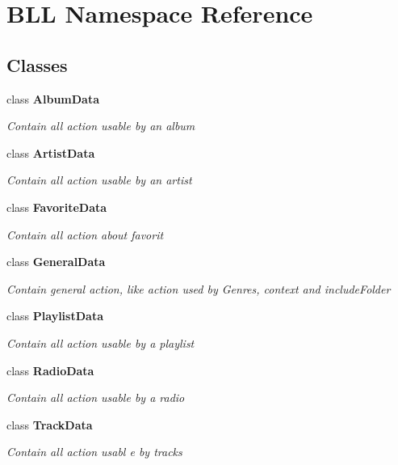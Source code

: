 \hypertarget{namespace_b_l_l}{}\section{B\+LL Namespace Reference}
\label{namespace_b_l_l}
\subsection*{Classes}
\begin{DoxyCompactItemize}
\item 
class {\bfseries Album\+Data}
\begin{DoxyCompactList}\small\item\em Contain all action usable by an album \end{DoxyCompactList}\item 
class {\bfseries Artist\+Data}
\begin{DoxyCompactList}\small\item\em Contain all action usable by an artist \end{DoxyCompactList}\item 
class {\bfseries Favorite\+Data}
\begin{DoxyCompactList}\small\item\em Contain all action about favorit \end{DoxyCompactList}\item 
class {\bfseries General\+Data}
\begin{DoxyCompactList}\small\item\em Contain general action, like action used by Genres, context and include\+Folder \end{DoxyCompactList}\item 
class {\bfseries Playlist\+Data}
\begin{DoxyCompactList}\small\item\em Contain all action usable by a playlist \end{DoxyCompactList}\item 
class {\bfseries Radio\+Data}
\begin{DoxyCompactList}\small\item\em Contain all action usable by a radio \end{DoxyCompactList}\item 
class {\bfseries Track\+Data}
\begin{DoxyCompactList}\small\item\em Contain all action usabl e by tracks \end{DoxyCompactList}\end{DoxyCompactItemize}

